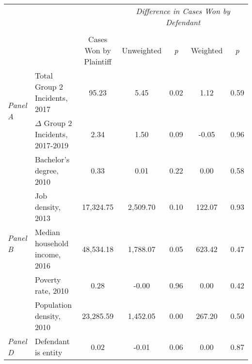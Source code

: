 \begin{tabular}{llccccc}
\toprule
 &  & \textit{} & \multicolumn{4}{c}{\textit{Difference in Cases Won by Defendant}} \\
\cline{4-7}
\\
 &  & Cases Won by Plaintiff & Unweighted & \emph{p} & Weighted & \emph{p} \\
\midrule
\multirow[c]{2}{3cm}{\textit{Panel A}} & Total Group 2 Incidents, 2017 & 95.23 & 5.45 & 0.02 & 1.12 & 0.59 \\
 & $\Delta$ Group 2 Incidents, 2017-2019 & 2.34 & 1.50 & 0.09 & -0.05 & 0.96 \\
\cline{1-7}
\multirow[c]{5}{3cm}{\textit{Panel B}} & Bachelor's degree, 2010 & 0.33 & 0.01 & 0.22 & 0.00 & 0.58 \\
 & Job density, 2013 & 17,324.75 & 2,509.70 & 0.10 & 122.07 & 0.93 \\
 & Median household income, 2016 & 48,534.18 & 1,788.07 & 0.05 & 623.42 & 0.47 \\
 & Poverty rate, 2010 & 0.28 & -0.00 & 0.96 & 0.00 & 0.42 \\
 & Population density, 2010 & 23,285.59 & 1,452.05 & 0.00 & 267.20 & 0.50 \\
\cline{1-7}
\textit{Panel D} & Defendant is entity & 0.02 & -0.01 & 0.06 & 0.00 & 0.87 \\
\cline{1-7}
\bottomrule
\end{tabular}
